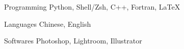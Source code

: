 


\begin{cvskills}


\cvskill
{Programming} %
{Python, Shell/Zsh, C++, Fortran, \LaTeX} %



\cvskill
{Languages} %
{Chinese, English} %



\cvskill
{Softwares} %
{Photoshop, Lightroom, Illustrator} %


\end{cvskills}